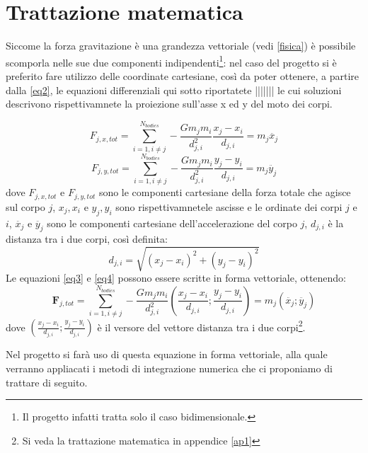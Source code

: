 \documentclass{article}
\begin{document}
\section{Trattazione matematica}
Siccome la forza gravitazione è una grandezza vettoriale (vedi \ref{fisica}) è possibile scomporla nelle sue due componenti indipendenti\footnote{Il progetto infatti tratta solo il caso bidimensionale.}: nel caso del progetto si è preferito fare utilizzo delle coordinate cartesiane, così da poter ottenere, a partire dalla \ref{eq2}, le equazioni differenziali qui sotto riportatete ||||||| le cui soluzioni descrivono rispettivamnete la proiezione sull'asse x ed y del moto dei corpi.

\begin{equation}
    F_{j,x,tot}=\sum_{i=1,i\neq j}^{N_{bodies}}-\frac{Gm_{j}m_{i}}{d_{j,i}^2}\frac{x_{j}-x_{i}}{d_{j,i}}=m_{j}\ddot{x_{j}}
    \label{eq3}
\end{equation}
\begin{equation}
    F_{j,y,tot}=\sum_{i=1,i\neq j}^{N_{bodies}}-\frac{Gm_{j}m_{i}}{d_{j,i}^2}\frac{y_{j}-y_{i}}{d_{j,i}}=m_{j}\ddot{y_{j}}
\label{eq4}
\end{equation}
dove $F_{j,x,tot}$ e $F_{j,y,tot}$ sono le componenti cartesiane della forza totale che agisce sul corpo $j$, $x_{j}, x_{i}$ e $y_{j}, y_{i}$ sono rispettivamnetele ascisse e le ordinate dei corpi $j$ e $i$, $\ddot{x_{j}}$ e $\ddot{y_{j}}$ sono le componenti cartesiane dell'accelerazione del corpo $j$, $d_{j,i}$ è la distanza tra i due corpi, così definita:
\begin{equation}
    d_{j,i}=\sqrt{(x_{j}-x_{i})^2+(y_{j}-y_{i})^2}
\end{equation}
Le equazioni \ref{eq3} e \ref{eq4} possono essere scritte in forma vettoriale, ottenendo:
\begin{equation}
    \textbf{F}_{j,tot}=\sum_{i=1,i\neq j}^{N_{bodies}}-\frac{Gm_{j}m_{i}}{d_{j,i}^2}(\frac{x_{j}-x_{i}}{d_{j,i}}; \frac{y_{j}-y_{i}}{d_{j,i}})=m_{j}(\ddot{x_{j}}; \ddot{y_{j}})
\label{eq5}
\end{equation}
dove $(\frac{x_{j}-x_{i}}{d_{j,i}}; \frac{y_{j}-y_{i}}{d_{j,i}})$ è il versore del vettore distanza tra i due corpi\footnote{Si veda la trattazione matematica in appendice \ref{ap1}}.

Nel progetto si farà uso di questa equazione in forma vettoriale, alla quale verranno appliacati i metodi di integrazione numerica che ci proponiamo di trattare di seguito.
\end{document}
